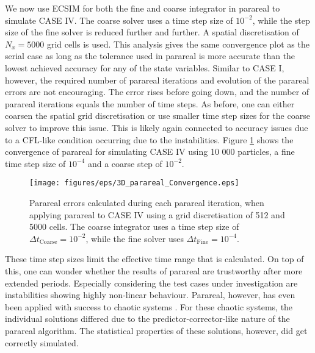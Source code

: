 We now use ECSIM for both the fine and coarse integrator in parareal to simulate CASE IV. The coarse solver uses a time step size of $10^{-2}$, while the step size of the fine solver is reduced further and further. A spatial discretisation of $N_x = 5000$ grid cells is used. This analysis gives the same convergence plot as the serial case as long as the tolerance used in parareal is more accurate than the lowest achieved accuracy for any of the state variables. Similar to CASE I, however, the required number of parareal iterations and evolution of the parareal errors are not encouraging. The error rises before going down, and the number of parareal iterations equals the number of time steps. As before, one can either coarsen the spatial grid discretisation or use smaller time step sizes for the coarse solver to improve this issue. This is likely again connected to accuracy issues due to a CFL-like condition occurring due to the instabilities. 
Figure \ref{fig: 1D-3V-parareal-convergence} shows the convergence of parareal for simulating CASE IV using 10 000 particles, a fine time step size of $10^{-4}$ and a coarse step of $10^{-2}$. 
\begin{figure}[h]
    \centering
    \texttt{[image: figures/eps/3D\_parareal\_Convergence.eps]}
    \caption{Parareal errors calculated during each parareal iteration, when applying parareal to CASE IV using a grid discretisation of 512 and 5000 cells. The coarse integrator uses a time step size of $\Delta t_\mathrm{Coarse} = 10^{-2}$, while the fine solver uses $\Delta t_\mathrm{Fine} = 10^{-4}$.}
    \label{fig: 1D-3V-parareal-convergence}
\end{figure}
These time step sizes limit the effective time range that is calculated. On top of this, one can wonder whether the results of parareal are trustworthy after more extended periods. Especially considering the test cases under investigation are instabilities showing highly non-linear behaviour. Parareal, however, has even been applied with success to chaotic systems \cite{d_samaddar_parallelization_2010}. For these chaotic systems, the individual solutions differed due to the predictor-corrector-like nature of the parareal algorithm. The statistical properties of these solutions, however, did get correctly simulated.

